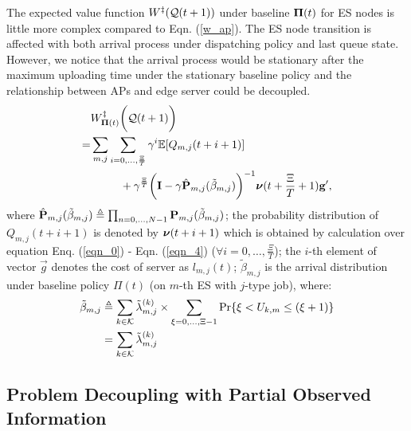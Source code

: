 The expected value function $W^{\ddagger}(\mathcal{Q}(t+1))$ under baseline $\boldsymbol{\Pi}(t)$ for ES nodes is little more complex compared to Eqn. (\ref{w_ap}).
The ES node transition is affected with both arrival process under dispatching policy and last queue state.
However, we notice that the arrival process would be stationary after the maximum uploading time under the stationary baseline policy and the relationship between APs and edge server could be decoupled.
\begin{align}
    &W^{\ddagger}_{\boldsymbol{\Pi}(t)}\bigg(\mathcal{Q}(t+1)\bigg)
    \nonumber\\
    =& \sum_{m,j}\sum_{i=0,\dots,\frac{\Xi}{T}} \gamma^{i} \mathbb{E}[ Q_{m,j}({t+i+1}) ]
    \nonumber\\
    &~~~~~~~~+ \gamma^{\frac{\Xi}{T}} \bigg( \mathbf{I} - \gamma \hat{\mathbf{P}}_{m,j}(\tilde{\beta}_{m,j}) \bigg)^{-1} \boldsymbol{\nu}({t+\frac{\Xi}{T}+1}) \mathbf{g}',
\end{align}
where $\hat{\mathbf{P}}_{m,j}(\tilde{\beta}_{m,j}) \triangleq \prod_{n=0,\dots,N-1} \mathbf{P}_{m,j}(\tilde{\beta}_{m,j})$;
the probability distribution of $Q_{m,j}({t+i+1})$ is denoted by $\boldsymbol{\nu}({t+i+1})$ which is obtained by calculation over equation Enq. (\ref{eqn_0}) - Eqn. (\ref{eqn_4}) ($\forall i=0,\dots,\frac{\Xi}{T}$);
the $i$-th element of vector $\vec{g}$ denotes the cost of server as $l_{m,j}(t)$;
$\tilde{\beta}_{m,j}$ is the arrival distribution under baseline policy $\Pi(t)$ (on $m$-th ES with $j$-type job), where:
\begin{align}
    \tilde{\beta}_{m,j} &\triangleq \sum_{k\in\mathcal{K}} \tilde{\lambda}^{(k)}_{m,j} \times \sum_{\xi=0,\dots,\Xi-1} \Pr\{ \xi<U_{k,m}\leq(\xi+1) \}
        \nonumber\\
    ~~~~&= \sum_{k\in\mathcal{K}} \tilde{\lambda}^{(k)}_{m,j}
\end{align}

\subsection{Problem Decoupling with Partial Observed Information}

